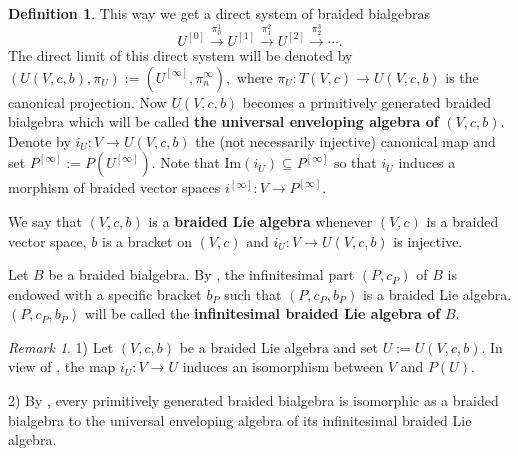 \documentclass[english]{amsart}
\numberwithin{equation}{section}
\numberwithin{figure}{section}
\theoremstyle{plain}
\theoremstyle{definition}
\newtheorem{defn}[thm]{Definition}
\theoremstyle{definition}
\theoremstyle{remark}
\theoremstyle{remark}
\newtheorem{rem}[thm]{Remark}
\theoremstyle{plain}
\theoremstyle{plain}
\theoremstyle{plain}
\begin{document}
\begin{defn}
This way we get a direct system of braided bialgebras \[
U^{\left[0\right]}\overset{\pi_{0}^{1}}{\rightarrow}U^{\left[1\right]}\overset{\pi_{1}^{2}}{\rightarrow}U^{\left[2\right]}\overset{\pi_{2}^{3}}{\rightarrow}\cdots.\]
 The direct limit of this direct system will be denoted by $\left(U\left(V,c,b\right),\pi_{U}\right):=\left(U^{\left[\infty\right]},\pi_{n}^{\infty}\right),$ where $\pi_{U}:T(V,c)\rightarrow U\left(V,c,b\right)$ is the canonical projection.
Now $U\left(V,c,b\right)$ becomes a primitively generated braided
bialgebra which will be called \textbf{the} \textbf{universal
enveloping algebra of} $\left(V,c,b\right).$ Denote by $i_{U}:V\rightarrow U\left(V,c,b\right)$
the (not necessarily injective) canonical map and set $P^{\left[\infty\right]}:=P\left(U^{\left[\infty\right]}\right).$
Note that $\mathrm{Im}\left(i_{U}\right)\subseteq P^{\left[\infty\right]}$
so that $i_{U}$ induces a morphism of braided vector spaces $i^{\left[\infty\right]}:V\rightarrow P^{\left[\infty\right]}$.

We say that $\left(V,c,b\right)$ is a \textbf{braided Lie algebra}
whenever $\left(V,c\right)$ is a braided vector space, $b$ is a
bracket on $\left(V,c\right)$ and $i_{U}:V\rightarrow U\left(V,c,b\right)$
is injective.

Let $B$ be a braided bialgebra. By \cite[Theorem 6.5]{Ardizzoni-MMPrim},
the infinitesimal part $\left(P,c_{P}\right)$ of $B$ is endowed
with a specific bracket $b_{P}$ such that $\left(P,c_{P},b_{P}\right)$
is a braided Lie algebra. $\left(P,c_{P},b_{P}\right)$ will be called
the \textbf{infinitesimal braided Lie algebra of} $B.$ \end{defn}
\begin{rem}
\label{rem:Milnor-Moore} 1) Let $\left(V,c,b\right)$ be a braided
Lie algebra and set $U:=U\left(V,c,b\right)$. In view of \cite[Corollary 5.6]{Ardizzoni-MMPrim},
the map $i_{U}:V\rightarrow U$ induces an isomorphism between $V$
and $P\left(U\right)$. 

2) By \cite[Theorem 6.9]{Ardizzoni-MMPrim}, every primitively generated
braided bialgebra is isomorphic as a braided bialgebra to the universal
enveloping algebra of its infinitesimal braided Lie algebra.\end{rem}
\end{document}
